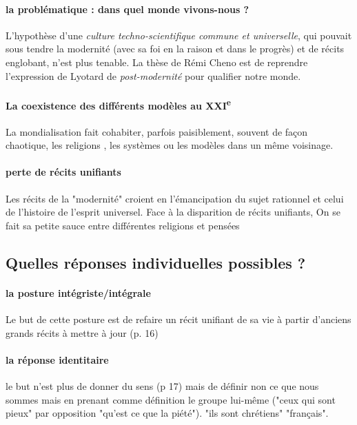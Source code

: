 \paragraph{la problématique : dans quel monde vivons-nous ?} L'hypothèse d'une \textit{culture techno-scientifique commune et universelle}, qui pouvait sous tendre la modernité (avec sa foi en la raison et dans le progrès) et de récits englobant, n'est plus tenable.
La thèse de Rémi Cheno est de reprendre l'expression de Lyotard de \textit{post-modernité} pour qualifier notre monde. 



\paragraph{La coexistence des différents modèles au XXI\textsuperscript{e}} La mondialisation fait cohabiter, parfois paisiblement, souvent de façon chaotique, les religions , les systèmes ou les modèles dans un même voisinage.   

\paragraph{perte de récits unifiants} Les récits de la "modernité" croient en l'émancipation du sujet rationnel et celui de l'histoire de l'esprit universel. Face à la disparition de récits unifiants, On se fait sa petite sauce entre différentes religions et pensées 

  
\subsection{Quelles réponses individuelles possibles ? }

\paragraph{la posture intégriste/intégrale} Le but de cette posture est de refaire un récit unifiant de sa vie à partir d'anciens grands récits à mettre à jour  (p. 16)
\paragraph{la réponse identitaire} le but n'est plus de donner du sens (p 17) mais de définir non ce que nous sommes mais en prenant comme définition le groupe lui-même ("ceux qui sont pieux" par opposition "qu'est ce que la piété"). "ils sont chrétiens" "français".
